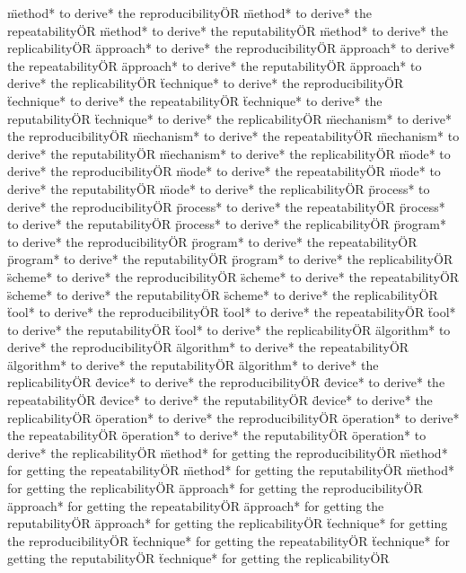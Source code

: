\documentclass[
10pt, %
a4paper, %
oneside, %
headinclude,footinclude, %
BCOR5mm, %
]{scrartcl}
\begin{document}
\"method* to derive* the reproducibility\" OR \"method* to derive* the repeatability\" OR \"method* to derive* the reputability\" OR \"method* to derive* the replicability\" OR 
\"approach* to derive* the reproducibility\" OR \"approach* to derive* the repeatability\" OR \"approach* to derive* the reputability\" OR \"approach* to derive* the replicability\" OR 
\"technique* to derive* the reproducibility\" OR \"technique* to derive* the repeatability\" OR \"technique* to derive* the reputability\" OR \"technique* to derive* the replicability\" OR 
\"mechanism* to derive* the reproducibility\" OR \"mechanism* to derive* the repeatability\" OR \"mechanism* to derive* the reputability\" OR \"mechanism* to derive* the replicability\" OR 
\"mode* to derive* the reproducibility\" OR \"mode* to derive* the repeatability\" OR \"mode* to derive* the reputability\" OR \"mode* to derive* the replicability\" OR 
\"process* to derive* the reproducibility\" OR \"process* to derive* the repeatability\" OR \"process* to derive* the reputability\" OR \"process* to derive* the replicability\" OR 
\"program* to derive* the reproducibility\" OR \"program* to derive* the repeatability\" OR \"program* to derive* the reputability\" OR \"program* to derive* the replicability\" OR 
\"scheme* to derive* the reproducibility\" OR \"scheme* to derive* the repeatability\" OR \"scheme* to derive* the reputability\" OR \"scheme* to derive* the replicability\" OR 
\"tool* to derive* the reproducibility\" OR \"tool* to derive* the repeatability\" OR \"tool* to derive* the reputability\" OR \"tool* to derive* the replicability\" OR 
\"algorithm* to derive* the reproducibility\" OR \"algorithm* to derive* the repeatability\" OR \"algorithm* to derive* the reputability\" OR \"algorithm* to derive* the replicability\" OR 
\"device* to derive* the reproducibility\" OR \"device* to derive* the repeatability\" OR \"device* to derive* the reputability\" OR \"device* to derive* the replicability\" OR 
\"operation* to derive* the reproducibility\" OR \"operation* to derive* the repeatability\" OR \"operation* to derive* the reputability\" OR \"operation* to derive* the replicability\" OR 
\"method* for getting the reproducibility\" OR \"method* for getting the repeatability\" OR \"method* for getting the reputability\" OR \"method* for getting the replicability\" OR 
\"approach* for getting the reproducibility\" OR \"approach* for getting the repeatability\" OR \"approach* for getting the reputability\" OR \"approach* for getting the replicability\" OR 
\"technique* for getting the reproducibility\" OR \"technique* for getting the repeatability\" OR \"technique* for getting the reputability\" OR \"technique* for getting the replicability\" OR 
\end{document}
